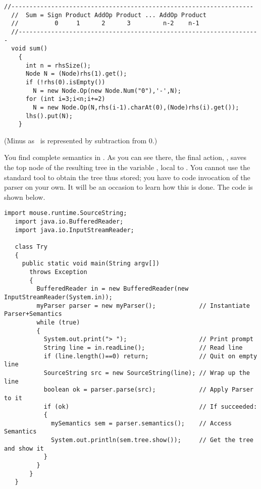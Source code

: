 \small
\begin{Verbatim}[frame=single,framesep=2mm,samepage=true,xleftmargin=15mm,xrightmargin=15mm,baselinestretch=0.8]
  //-------------------------------------------------------------------
  //  Sum = Sign Product AddOp Product ... AddOp Product
  //          0     1      2      3         n-2    n-1
  //-------------------------------------------------------------------
  void sum()
    {
      int n = rhsSize();
      Node N = (Node)rhs(1).get();
      if (!rhs(0).isEmpty())
        N = new Node.Op(new Node.Num("0"),'-',N);
      for (int i=3;i<n;i+=2)
        N = new Node.Op(N,rhs(i-1).charAt(0),(Node)rhs(i).get());
      lhs().put(N);
    }
\end{Verbatim}
\normalsize

(Minus as \Sign\ is represented by subtraction from 0.)

You find complete semantics in .
As you can see there, the final action, ,
saves the top node of the resulting tree in the variable ,
local to .
You cannot use the standard tool  to obtain the 
tree thus stored;
you have to code invocation of the parser on your own.
It will be an occasion to learn how this is done.
The code is shown below.

\medskip
\small
\begin{Verbatim}[frame=single,framesep=2mm,samepage=true,xleftmargin=6mm,xrightmargin=6mm,baselinestretch=0.8]
   import mouse.runtime.SourceString;
   import java.io.BufferedReader;
   import java.io.InputStreamReader;

   class Try
   {
     public static void main(String argv[])
       throws Exception
       {
         BufferedReader in = new BufferedReader(new InputStreamReader(System.in));
         myParser parser = new myParser();            // Instantiate Parser+Semantics
         while (true)
         {
           System.out.print("> ");                    // Print prompt
           String line = in.readLine();               // Read line
           if (line.length()==0) return;              // Quit on empty line
           SourceString src = new SourceString(line); // Wrap up the line
           boolean ok = parser.parse(src);            // Apply Parser to it
           if (ok)                                    // If succeeded:
           {
             mySemantics sem = parser.semantics();    // Access Semantics
             System.out.println(sem.tree.show());     // Get the tree and show it
           }
         }
       }
   }
\end{Verbatim}
\normalsize

